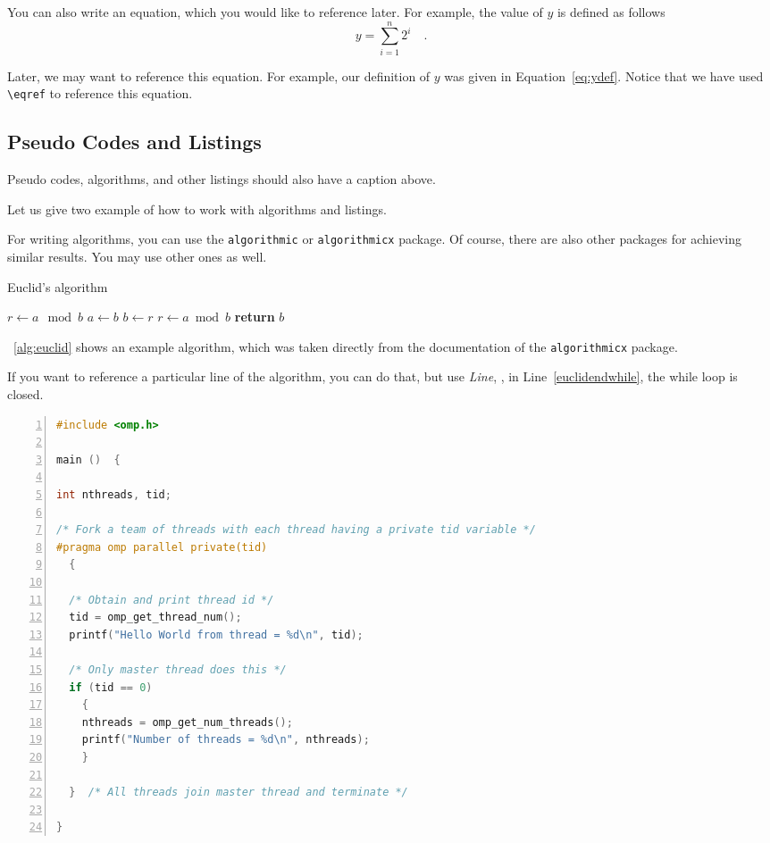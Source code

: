 You can also write an equation, which you would like to reference later.
For example, the value of $y$ is defined as follows
\begin{equation}
\label{eq:ydef}
y = \sum_{i=1}^{n} 2^i \quad .
\end{equation}

Later, we may want to reference this equation. For example, our
definition of $y$ was given in Equation~\eqref{eq:ydef}.  Notice that
we have used \verb|\eqref| to reference this equation.

\subsection{Pseudo Codes and Listings}

Pseudo codes, algorithms, and other listings should also have a
caption above.

Let us give two example of how to work with algorithms and listings.

For writing algorithms, you can use the \verb|algorithmic| or
\verb|algorithmicx| package. Of course, there are also other packages
for achieving similar results. You may use other ones as well.

\begin{algorithm}[t]
\caption{Euclid’s algorithm}\label{alg:euclid}
\begin{algorithmic}[1]
  \State $r\gets a \mod b$
  \State $a\gets b$
  \State $b\gets r$
  \State $r\gets a\bmod b$
  \EndWhile\label{euclidendwhile}
  \State \textbf{return} $b$
  \EndProcedure
\end{algorithmic}
\end{algorithm}

\alg~\ref{alg:euclid} shows an example algorithm, which was taken
directly from the documentation of the \verb|algorithmicx| package.

If you want to reference a particular line of the algorithm, you can
do that, but use \emph{Line}, \eg, in Line~\ref{euclidendwhile}, the
while loop is closed.

\begin{lstlisting}[language=C++,
  caption={Example of OpenMP program.},
  float=h,
  numbers=left]
#include <omp.h>

main ()  {

int nthreads, tid;

/* Fork a team of threads with each thread having a private tid variable */
#pragma omp parallel private(tid)
  {

  /* Obtain and print thread id */
  tid = omp_get_thread_num();
  printf("Hello World from thread = %d\n", tid);

  /* Only master thread does this */
  if (tid == 0) 
    {
    nthreads = omp_get_num_threads();
    printf("Number of threads = %d\n", nthreads);
    }

  }  /* All threads join master thread and terminate */

}
\end{lstlisting}


